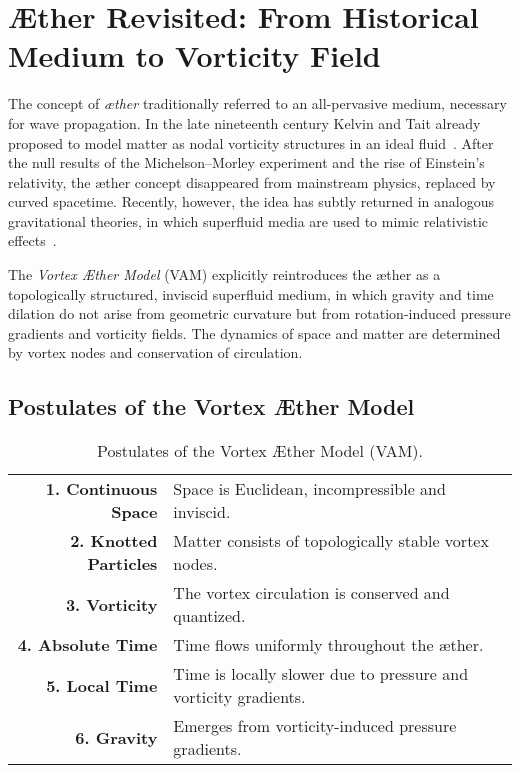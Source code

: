 \section*{Æther Revisited: From Historical Medium to Vorticity Field}

The concept of \textit{æther} traditionally referred to an all-pervasive medium, necessary for wave propagation. In the late nineteenth century Kelvin and Tait already proposed to model matter as nodal vorticity structures in an ideal fluid~\cite{thomson1867treatise}. After the null results of the Michelson--Morley experiment and the rise of Einstein's relativity, the æther concept disappeared from mainstream physics, replaced by curved spacetime. Recently, however, the idea has subtly returned in analogous gravitational theories, in which superfluid media are used to mimic relativistic effects~\cite{barcelo2011analogue,volovik2009universe}.

The \textit{Vortex Æther Model} (VAM) explicitly reintroduces the æther as a topologically structured, inviscid superfluid medium, in which gravity and time dilation do not arise from geometric curvature but from rotation-induced pressure gradients and vorticity fields. The dynamics of space and matter are determined by vortex nodes and conservation of circulation.

\subsection*{Postulates of the Vortex Æther Model}

\begin{table}[h!]
    \centering
    \begin{tabular}{rl}
        \midrule
        \hline
        \textbf{1. Continuous Space} & Space is Euclidean, incompressible and inviscid. \\
        \textbf{2. Knotted Particles} & Matter consists of topologically stable vortex nodes. \\
        \textbf{3. Vorticity} & The vortex circulation is conserved and quantized. \\
        \textbf{4. Absolute Time} & Time flows uniformly throughout the æther. \\
        \textbf{5. Local Time} & Time is locally slower due to pressure and vorticity gradients. \\
        \textbf{6. Gravity} & Emerges from vorticity-induced pressure gradients. \\
        \hline
        \bottomrule
    \end{tabular}
    \caption{Postulates of the Vortex Æther Model (VAM).}
    \label{tab:postulates}
\end{table}

